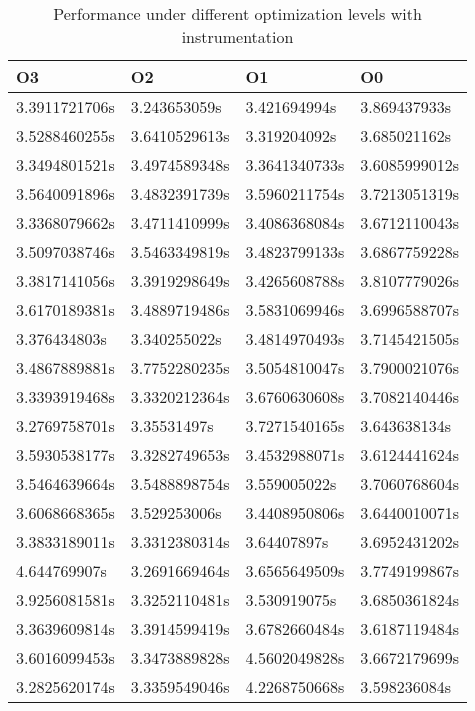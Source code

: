 \begin{table}[]
  \centering
  \caption{Performance under different optimization levels with instrumentation}
  \label{table:instrumented_optimizations_benchmark}
  \begin{tabular}{llll}
    O3            & O2            & O1            & O0            \\ \hline
    3.3911721706s & 3.243653059s  & 3.421694994s  & 3.869437933s  \\
    3.5288460255s & 3.6410529613s & 3.319204092s  & 3.685021162s  \\
    3.3494801521s & 3.4974589348s & 3.3641340733s & 3.6085999012s \\
    3.5640091896s & 3.4832391739s & 3.5960211754s & 3.7213051319s \\
    3.3368079662s & 3.4711410999s & 3.4086368084s & 3.6712110043s \\
    3.5097038746s & 3.5463349819s & 3.4823799133s & 3.6867759228s \\
    3.3817141056s & 3.3919298649s & 3.4265608788s & 3.8107779026s \\
    3.6170189381s & 3.4889719486s & 3.5831069946s & 3.6996588707s \\
    3.376434803s  & 3.340255022s  & 3.4814970493s & 3.7145421505s \\
    3.4867889881s & 3.7752280235s & 3.5054810047s & 3.7900021076s \\
    3.3393919468s & 3.3320212364s & 3.6760630608s & 3.7082140446s \\
    3.2769758701s & 3.35531497s   & 3.7271540165s & 3.643638134s  \\
    3.5930538177s & 3.3282749653s & 3.4532988071s & 3.6124441624s \\
    3.5464639664s & 3.5488898754s & 3.559005022s  & 3.7060768604s \\
    3.6068668365s & 3.529253006s  & 3.4408950806s & 3.6440010071s \\
    3.3833189011s & 3.3312380314s & 3.64407897s   & 3.6952431202s \\
    4.644769907s  & 3.2691669464s & 3.6565649509s & 3.7749199867s \\
    3.9256081581s & 3.3252110481s & 3.530919075s  & 3.6850361824s \\
    3.3639609814s & 3.3914599419s & 3.6782660484s & 3.6187119484s \\
    3.6016099453s & 3.3473889828s & 4.5602049828s & 3.6672179699s \\
    3.2825620174s & 3.3359549046s & 4.2268750668s & 3.598236084s  \\

\end{tabular}
\end{table}
